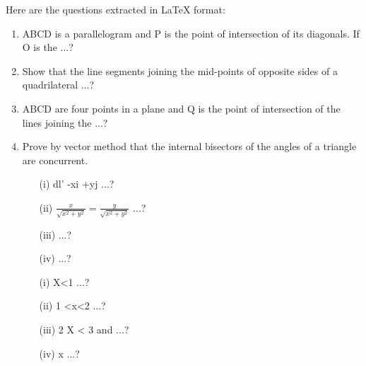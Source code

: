 Here are the questions extracted in LaTeX format:

\begin{enumerate}
\item ABCD is a parallelogram and P is the point of intersection of its diagonals. If O is the ...?
\item Show that the line segments joining the mid-points of opposite sides of a quadrilateral ...?
\item ABCD are four points in a plane and Q is the point of intersection of the lines joining the ...?
\item Prove by vector method that the internal bisectors of the angles of a triangle are concurrent.
\begin{enumerate}
\item[(i)] dl’ -xi +yj ...?
\item[(ii)] $\frac{x}{\sqrt{x^2+y^2}}= \frac{y}{\sqrt{x^2+y^2}}$ ...?
\item[(iii)] ...?
\item[(iv)] ...?
\end{enumerate}
\begin{enumerate}
\item[(i)] X<1 ...?
\item[(ii)] 1 <x<2 ...?
\item[(iii)] 2 \leq X < 3 and ...?
\item[(iv)] x  ...?
\end{enumerate}
\end{enumerate}